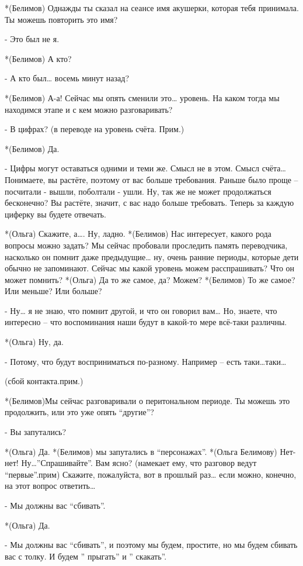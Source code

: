 *(Белимов) Однажды ты сказал на сеансе имя акушерки, которая тебя принимала. Ты можешь повторить это имя?

- Это был не я.

*(Белимов) А кто?

- А кто был… восемь минут назад?

*(Белимов) А-а! Сейчас мы опять сменили это… уровень. На каком тогда мы находимся этапе и с кем можно разговаривать?

- В цифрах? (в переводе на уровень счёта. Прим.)

*(Белимов) Да.

- Цифры могут оставаться одними и теми же. Смысл не в этом. Смысл счёта… Понимаете, вы растёте, поэтому от вас больше требования. Раньше было проще – посчитали - вышли, поболтали - ушли. Ну, так же не может продолжаться бесконечно? Вы растёте, значит, с вас надо больше требовать. Теперь за каждую циферку вы будете отвечать.

*(Ольга) Скажите, а…. Ну, ладно.
*(Белимов) Нас интересует, какого рода вопросы можно задать? Мы сейчас пробовали проследить память переводчика, насколько он помнит даже предыдущие… ну, очень ранние периоды, которые дети обычно не запоминают. Сейчас мы какой уровень можем расспрашивать? Что он может помнить?
*(Ольга) Да то же самое, да? Можем?
*(Белимов) То же самое? Или меньше? Или больше?

- Ну… я не знаю, что помнит другой, и что он говорил вам… Но, знаете, что интересно – что воспоминания наши будут в какой-то мере всё-таки различны.

*(Ольга) Ну, да.

- Потому, что будут восприниматься по-разному. Например – есть таки…таки…

(сбой контакта.прим.)

*(Белимов)Мы сейчас разговаривали о перитональном периоде. Ты можешь это продолжить, или это уже опять “другие”?

- Вы запутались?

*(Ольга) Да.
*(Белимов) мы запутались в “персонажах”.
*(Ольга Белимову) Нет-нет! Ну…”Спрашивайте”. Вам ясно? (намекает ему, что разговор ведут “первые”.прим) Скажите, пожалуйста, вот в прошлый раз… если можно, конечно, на этот вопрос ответить…

- Мы должны вас “сбивать”.

*(Ольга) Да.

- Мы должны вас “сбивать”, и поэтому мы будем, простите, но мы будем сбивать вас с толку. И будем ” прыгать” и ” скакать”.

